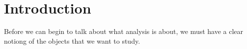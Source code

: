 
\section{Introduction}
Before we can begin to talk about what analysis is about, we must have a clear notiong of the objects that we want to study.
